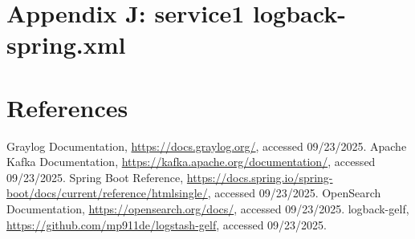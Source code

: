 \documentclass[12pt,a4paper]{report}
\begin{document}
\chapter{Appendix J: service1 logback-spring.xml}

\chapter*{References}
\begin{thebibliography}{9}
 Graylog Documentation, \url{https://docs.graylog.org/}, accessed 09/23/2025.
 Apache Kafka Documentation, \url{https://kafka.apache.org/documentation/}, accessed 09/23/2025.
 Spring Boot Reference, \url{https://docs.spring.io/spring-boot/docs/current/reference/htmlsingle/}, accessed 09/23/2025.
 OpenSearch Documentation, \url{https://opensearch.org/docs/}, accessed 09/23/2025.
 logback-gelf, \url{https://github.com/mp911de/logstash-gelf}, accessed 09/23/2025.
\end{thebibliography}
\end{document}
